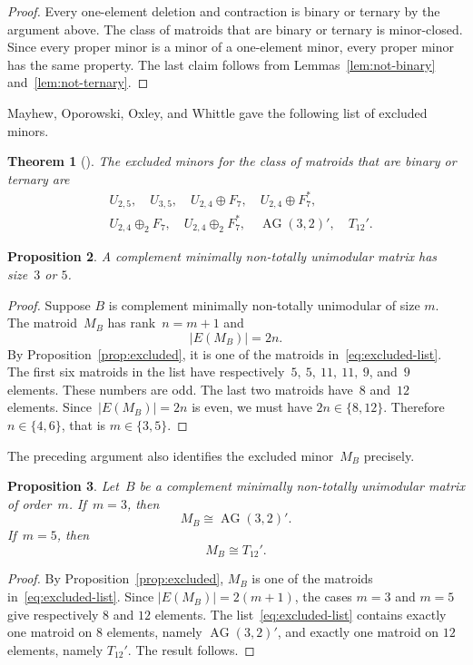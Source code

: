 \documentclass{amsart}
\newtheorem{theorem}{Theorem}[section]
\newtheorem{proposition}[theorem]{Proposition}
\numberwithin{equation}{section}
\DeclareMathOperator{\AG}{AG}
\begin{document}
\begin{proof}
    Every one-element deletion and contraction is binary or ternary by the argument above.
    The class of matroids that are binary or ternary is minor-closed.
    Since every proper minor is a minor of a one-element minor, every proper minor has the same property.
    The last claim follows from Lemmas~\ref{lem:not-binary} and~\ref{lem:not-ternary}.
\end{proof}

Mayhew, Oporowski, Oxley, and Whittle gave the following list of excluded minors.

\begin{theorem}[{\cite[Theorem~1.1]{Mayhew-Oporowski-Oxley-Whittle2011}}] \label{thm:MOOW}
    The excluded minors for the class of matroids that are binary or ternary are
    \begin{equation}\label{eq:excluded-list}
        \begin{split}
            &U_{2,5},\quad U_{3,5},\quad U_{2,4}\oplus F_7,\quad U_{2,4}\oplus F_7^*,\\
            &U_{2,4}\oplus_2 F_7,\quad U_{2,4}\oplus_2 F_7^*,\quad \AG(3,2)',\quad T_{12}'.
        \end{split}
    \end{equation}
\end{theorem}

\begin{proposition}\label{prop:sizes}
    A complement minimally non-totally unimodular matrix has size~$3$ or $5$.
\end{proposition}
\begin{proof}
    Suppose $B$ is complement minimally non-totally unimodular of size $m$.
    The matroid~$M_B$ has rank~$n=m+1$ and
    $$
        |E(M_B)|=2n.
    $$
    By Proposition~\ref{prop:excluded}, it is one of the matroids in~\eqref{eq:excluded-list}.
    The first six matroids in the list have respectively~$5,\ 5,\ 11,\ 11,\ 9$, and~$9$ elements.
    These numbers are odd.
    The last two matroids have~$8$ and~$12$ elements.
    Since~$|E(M_B)|=2n$ is even, we must have $2n\in\{8,12\}$.
    Therefore~$n\in\{4,6\}$, that is $m\in\{3,5\}$.
\end{proof}

The preceding argument also identifies the excluded minor~$M_B$ precisely.

\begin{proposition}\label{prop:identify}
    Let~$B$ be a complement minimally non-totally unimodular matrix of order~$m$.
    If~$m=3$, then
    $$
        M_B\cong \AG(3,2)'.
    $$
    If~$m=5$, then
    $$
        M_B\cong T_{12}'.
    $$
\end{proposition}
\begin{proof}
    By Proposition~\ref{prop:excluded}, $M_B$ is one of the matroids in~\eqref{eq:excluded-list}.
    Since $|E(M_B)|=2(m+1)$, the cases $m=3$ and $m=5$ give respectively $8$ and $12$ elements.
    The list~\eqref{eq:excluded-list} contains exactly one matroid on $8$ elements, namely $\AG(3,2)'$, and exactly one matroid on $12$ elements, namely $T_{12}'$.
    The result follows.
\end{proof}
\end{document}
